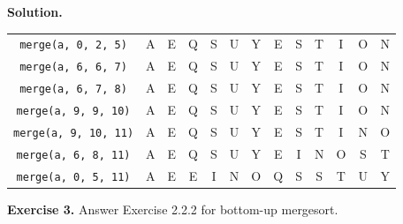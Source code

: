 \documentclass[12pt, a4paper]{article}
\newenvironment{ex}[2][Exercise]
{\par\medskip\noindent \textbf{#1 #2.}}
{\medskip}
\newenvironment{sol}[1][Solution]
{\par\medskip\noindent \textbf{#1.} }
{\medskip}
\begin{document}
\begin{sol}
\begin{center}
\begin{tabular}{c|cccccccccccc}
				\texttt{merge(a, {\color{red}0}, 2, {\color{red}5})}
				& {\color{black}A} & {\color{black}E} & {\color{black}Q} & {\color{black}S} & {\color{black}U} & {\color{black}Y} & {\color{gray}E} & {\color{gray}S} & {\color{gray}T} & {\color{gray}I} & {\color{gray}O} & {\color{gray}N}\\
				
				\texttt{merge(a, {\color{red}6}, 6, {\color{red}7})}
				& {\color{gray}A} & {\color{gray}E} & {\color{gray}Q} & {\color{gray}S} & {\color{gray}U} & {\color{gray}Y} & {\color{black}E} & {\color{black}S} & {\color{gray}T} & {\color{gray}I} & {\color{gray}O} & {\color{gray}N}\\
				
				\texttt{merge(a, {\color{red}6}, 7, {\color{red}8})}
				& {\color{gray}A} & {\color{gray}E} & {\color{gray}Q} & {\color{gray}S} & {\color{gray}U} & {\color{gray}Y} & {\color{black}E} & {\color{black}S} & {\color{black}T} & {\color{gray}I} & {\color{gray}O} & {\color{gray}N}\\
				
				\texttt{merge(a, {\color{red}9}, 9, {\color{red}10})}
				& {\color{gray}A} & {\color{gray}E} & {\color{gray}Q} & {\color{gray}S} & {\color{gray}U} & {\color{gray}Y} & {\color{gray}E} & {\color{gray}S} & {\color{gray}T} & {\color{black}I} & {\color{black}O} & {\color{gray}N}\\
				
				\texttt{merge(a, {\color{red}9}, 10, {\color{red}11})}
				& {\color{gray}A} & {\color{gray}E} & {\color{gray}Q} & {\color{gray}S} & {\color{gray}U} & {\color{gray}Y} & {\color{gray}E} & {\color{gray}S} & {\color{gray}T} & {\color{black}I} & {\color{black}N} & {\color{black}O}\\
				
				\texttt{merge(a, {\color{red}6}, 8, {\color{red}11})}
				& {\color{gray}A} & {\color{gray}E} & {\color{gray}Q} & {\color{gray}S} & {\color{gray}U} & {\color{gray}Y} & {\color{black}E} & {\color{black}I} & {\color{black}N} & {\color{black}O} & {\color{black}S} & {\color{black}T}\\
				
				\texttt{merge(a, {\color{red}0}, 5, {\color{red}11})}
				& A & E & E & I & N & O & Q & S & S & T & U & Y\\
			\end{tabular}
		\end{center}
	\end{sol}
	\begin{ex}{3}
		Answer Exercise 2.2.2 for bottom-up mergesort.
	\end{ex}
\end{document}
